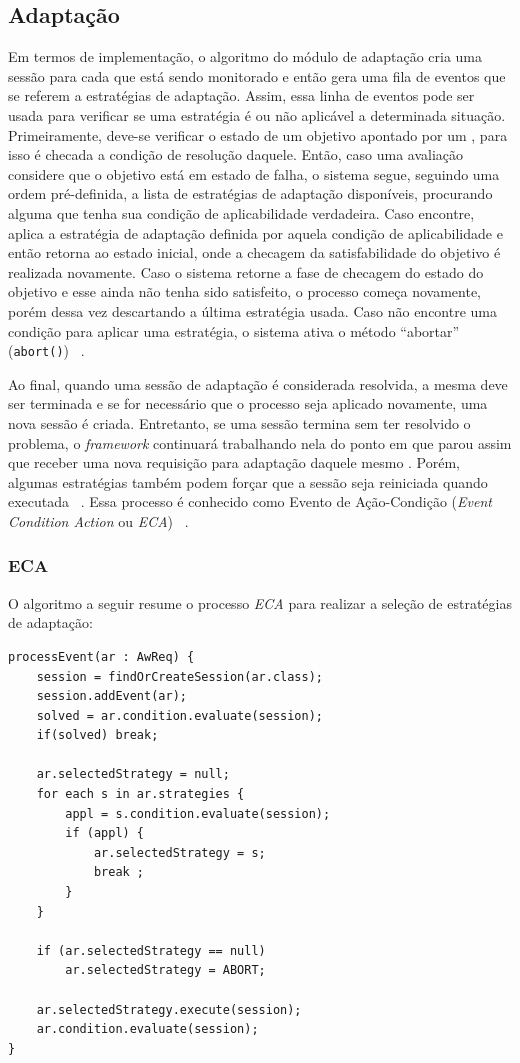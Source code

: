 \subsection{Adaptação}
\label{sec-referencial-zanshin-adaptacao}
Em termos de implementação, o algoritmo do módulo de adaptação cria uma sessão para cada \awreq que está sendo monitorado e então gera uma fila de eventos que se referem a estratégias de adaptação. Assim, essa linha de eventos pode ser usada para verificar se uma estratégia é ou não aplicável a determinada situação. Primeiramente, deve-se verificar o estado de um objetivo apontado por um \awreq, para isso é checada a condição de resolução daquele. Então, caso uma avaliação considere que o objetivo está em estado de falha, o sistema segue, seguindo uma ordem pré-definida, a lista de estratégias de adaptação disponíveis, procurando alguma que tenha sua condição de aplicabilidade verdadeira. Caso encontre, aplica a estratégia de adaptação definida por aquela condição de aplicabilidade e então retorna ao estado inicial, onde a checagem da satisfabilidade do objetivo é realizada novamente. Caso o sistema retorne a fase de checagem do estado do objetivo e esse ainda não tenha sido satisfeito, o processo começa novamente, porém dessa vez descartando a última estratégia usada. Caso não encontre uma condição para aplicar uma estratégia, o sistema ativa o método ``abortar'' (\texttt{abort()}) ~\cite{souza2013requirements}. 

Ao final, quando uma sessão de adaptação é considerada resolvida, a mesma deve ser terminada e se for necessário que o processo seja aplicado novamente, uma nova sessão é criada. Entretanto, se uma sessão termina sem ter resolvido o problema, o \textit{framework} continuará trabalhando nela do ponto em que parou assim que receber uma nova requisição para adaptação daquele mesmo \awreq. Porém, algumas estratégias também podem forçar que a sessão seja reiniciada quando executada ~\cite{souza2013requirements}. Essa processo é conhecido como Evento de Ação-Condição (\textit{Event Condition Action} ou \textit{ECA}) ~\cite{morin2009models}.

\subsubsection{ECA}

O algoritmo a seguir resume o processo \textit{ECA} para realizar a seleção de estratégias de adaptação:

\begin{lstlisting}
processEvent(ar : AwReq) {
	session = findOrCreateSession(ar.class);
	session.addEvent(ar);
	solved = ar.condition.evaluate(session);
	if(solved) break;

	ar.selectedStrategy = null;
	for each s in ar.strategies {
		appl = s.condition.evaluate(session);
		if (appl) {
			ar.selectedStrategy = s;
			break ;
		}
	}

	if (ar.selectedStrategy == null)
		ar.selectedStrategy = ABORT;

	ar.selectedStrategy.execute(session);
	ar.condition.evaluate(session);
}
\end{lstlisting}

